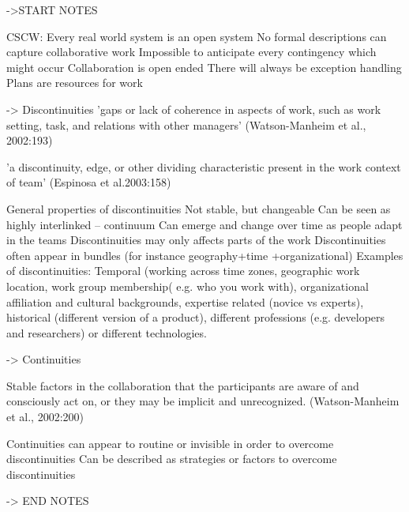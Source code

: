 ->START NOTES

CSCW: Every real world system is an open system
No formal descriptions can capture collaborative work
Impossible to anticipate every contingency which might occur
Collaboration is open ended
There will always be exception handling
Plans are resources for work

-> Discontinuities
'gaps or lack of coherence in aspects of work, such as work 
setting, task, and relations with other managers' (Watson-Manheim et al., 2002:193)

'a discontinuity, edge, or other dividing characteristic 
present in the work context of team' (Espinosa et al.2003:158)


General properties of discontinuities 
Not stable, but changeable 
Can be seen as highly interlinked – continuum
Can emerge and change over time as people adapt in the teams 
Discontinuities may only affects parts of the work 
Discontinuities often appear in bundles (for instance geography+time
+organizational)
Examples of discontinuities: Temporal (working across time zones, 
geographic work location, work group membership( e.g. who you work 
with), organizational affiliation and cultural backgrounds, expertise related 
(novice vs experts), historical (different version of a product), different 
professions (e.g. developers and researchers) or different technologies.

-> Continuities

Stable factors in the collaboration that the participants are 
aware of and consciously act on, or they may be implicit and 
unrecognized. (Watson-Manheim et al., 2002:200) 

Continuities can appear to routine or invisible in order to 
overcome discontinuities
Can be described as strategies or factors to overcome 
discontinuities

-> END NOTES
